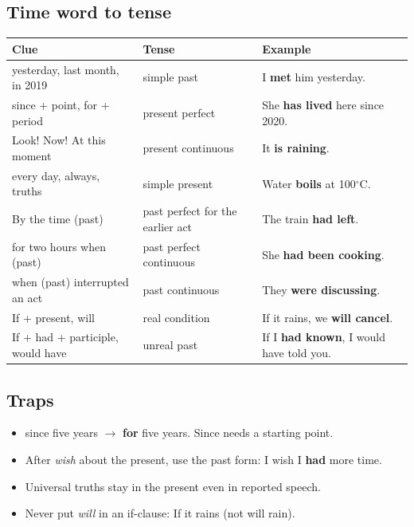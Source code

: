 \documentclass[11pt,a4paper]{article}
\newcommand{\bad}[1]{\textcolor{ember}{#1}}
\newcommand{\good}[1]{\textbf{#1}}
\begin{document}
\subsection*{Time word to tense}
\begin{center}\small\renewcommand{\arraystretch}{1.25}
\begin{tabularx}{\linewidth}{@{}>{\raggedright\arraybackslash}p{4.2cm} >{\raggedright\arraybackslash}X >{\raggedright\arraybackslash}X@{}}
\toprule
\textbf{Clue} & \textbf{Tense} & \textbf{Example}\\
\midrule
yesterday, last month, in 2019 & simple past & I \good{met} him yesterday.\\
since + point, for + period & present perfect & She \good{has lived} here since 2020.\\
Look! Now! At this moment & present continuous & It \good{is raining}.\\
every day, always, truths & simple present & Water \good{boils} at 100$^\circ$C.\\
By the time (past) & past perfect for the earlier act & The train \good{had left}.\\
for two hours when (past) & past perfect continuous & She \good{had been cooking}.\\
when (past) interrupted an act & past continuous & They \good{were discussing}.\\
If + present, will & real condition & If it rains, we \good{will cancel}.\\
If + had + participle, would have & unreal past & If I \good{had known}, I would have told you.\\
\bottomrule
\end{tabularx}
\end{center}
\subsection*{Traps}
\begin{itemize}
\item \bad{since} five years $\rightarrow$ \good{for} five years. Since needs a starting point.
\item After \emph{wish} about the present, use the past form: I wish I \good{had} more time.
\item Universal truths stay in the present even in reported speech.
\item Never put \emph{will} in an if-clause: If it rains (not \bad{will rain}).
\end{itemize}
\end{document}
